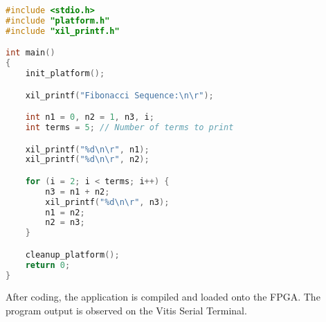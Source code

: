 \begin{lstlisting}[language=C, caption={Fibonacci Sequence Program}]
#include <stdio.h>
#include "platform.h"
#include "xil_printf.h"

int main()
{
    init_platform();

    xil_printf("Fibonacci Sequence:\n\r");

    int n1 = 0, n2 = 1, n3, i;
    int terms = 5; // Number of terms to print

    xil_printf("%d\n\r", n1);
    xil_printf("%d\n\r", n2);

    for (i = 2; i < terms; i++) {
        n3 = n1 + n2;
        xil_printf("%d\n\r", n3);
        n1 = n2;
        n2 = n3;
    }

    cleanup_platform();
    return 0;
}
\end{lstlisting}

After coding, the application is compiled and loaded onto the FPGA. The program output is observed on the Vitis Serial Terminal.

